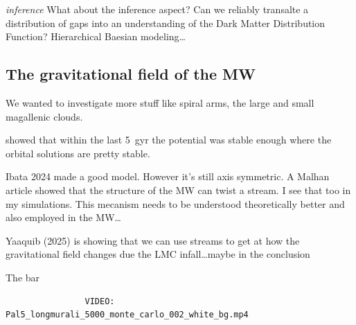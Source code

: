             

        \textit{inference}
            What about the inference aspect? Can we reliably transalte a distribution of gaps into an understanding of the Dark Matter Distribution Function? Hierarchical Baesian modeling\dots

    \subsection{The gravitational field of the MW}
            We wanted to investigate more stuff like spiral arms, the large and small magallenic clouds. 

            \citet{2023A&A...673A.152I} showed that within the last 5~gyr the potential was stable enough where the orbital solutions are pretty stable. 

            Ibata 2024 made a good model. However it's still axis symmetric. A Malhan article showed that the structure of the MW can twist a stream. I see that too in my simulations. This mecanism needs to be understood theoretically better and also employed in the MW\dots

            Yaaquib (2025) is showing that we can use streams to get at how the gravitational field changes due the LMC infall\dots maybe in the conclusion 

            The bar 
            \begin{verbatim}
                VIDEO: Pal5_longmurali_5000_monte_carlo_002_white_bg.mp4
            \end{verbatim}


